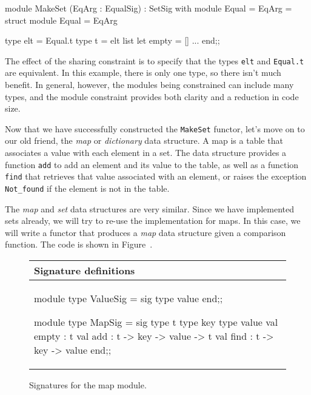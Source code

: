 \begin{ocaml}
module MakeSet (EqArg : EqualSig)
 : SetSig with module Equal = EqArg =
struct
   module Equal = EqArg

   type elt = Equal.t
   type t = elt list
   let empty = []
   ...
end;;
\end{ocaml}
%
The effect of the sharing constraint is to specify that the
types \hbox{\lstinline$elt$} and \hbox{\lstinline$Equal.t$} are
equivalent.  In this example, there is only one type, so there isn't
much benefit.  In general, however, the modules being constrained can
include many types, and the module constraint provides both clarity
and a reduction in code size.


Now that we have successfully constructed the \hbox{\lstinline/MakeSet/} functor, let's move on to
our old friend, the \emph{map} or \emph{dictionary} data structure.  A map is a table that
associates a value with each element in a set. The data structure provides a
function \hbox{\lstinline/add/} to add an element and its value to the table, as well as a
function \hbox{\lstinline/find/} that retrieves that value associated with an element, or raises the
exception \hbox{\lstinline/Not_found/} if the element is not in the table.

The \emph{map} and \emph{set} data structures are very similar. Since
we have implemented sets already, we will try to re-use the
implementation for maps.  In this case, we will write a functor that
produces a \emph{map} data structure given a comparison function. The
code is shown in Figure~.

\begin{figure}
\begin{center}
\begin{tabular}{l}
Signature definitions\\
\hline
\begin{ocamllisting}
module type ValueSig = sig
   type value
end;;

module type MapSig = sig
   type t
   type key
   type value
   val empty : t
   val add : t -> key -> value -> t
   val find : t -> key -> value
end;;
\end{ocamllisting}
\end{tabular}
\end{center}
\caption{Signatures for the map module.}
\end{figure}

